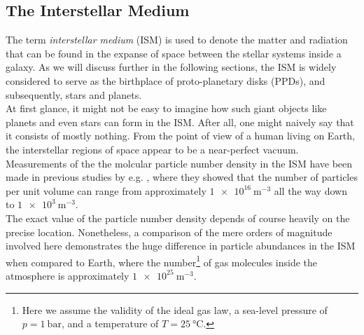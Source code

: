 
\clearpage\subsection{The Interstellar Medium}

    The term \textit{interstellar medium} (ISM) is used to denote the matter and radiation that 
    can be found in the expanse of space between the stellar systems inside a galaxy. 
    As we will discuss further in the following sections, the ISM is widely considered to serve 
    as the birthplace of proto-planetary disks (PPDs), and subsequently, stars and planets. \\

    At first glance, it might not be easy to imagine how such giant objects like planets and 
    even stars can form in the ISM. After all, one might naively say that it consists of mostly
    nothing. From the point of view of a human living on Earth, the interstellar regions of
    space appear to be a near-perfect vacuum. 
    Measurements of the the molcular particle number density in the ISM have been made in 
    previous studies by e.g. \cite{burton_2013}, where they showed that the number of
    particles per unit volume can range from approximately $\SI{1e16}{\meter^{-3}}$ all the way 
    down to $\SI{1e3}{\meter^{-3}}$. \\

    The exact value of the particle number density depends of course heavily on the precise 
    location. Nonetheless, a comparison of the mere orders of magnitude involved 
    here demonstrates the huge difference in particle abundances in the ISM when compared to 
    Earth, where the number\footnote{Here we assume the validity of the ideal gas law, 
        a sea-level pressure of $p=\SI{1}{\bar}$, and a temperature of $T=\SI{25}{\celsius}$.}
    of gas molecules inside the atmosphere is approximately $\SI{1e25}{\meter^{-3}}$. \\

